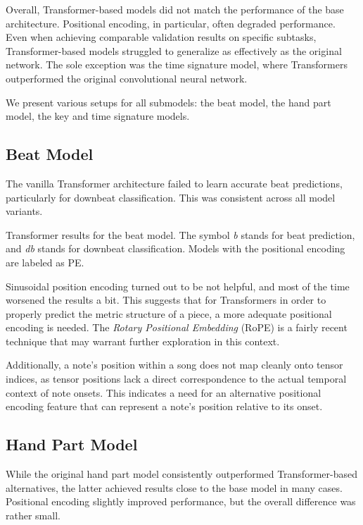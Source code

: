 Overall, Transformer-based models did not match the performance of the base architecture. Positional encoding, in particular, often degraded performance. Even when achieving comparable validation results on specific subtasks, Transformer-based models struggled to generalize as effectively as the original network. The sole exception was the time signature model, where Transformers outperformed the original convolutional neural network.

We present various setups for all submodels: the beat model, the hand part model, the key and time signature models.

\subsection{Beat Model}

The vanilla Transformer architecture failed to learn accurate beat predictions, particularly for downbeat classification. This was consistent across all model variants.

\begin{table}[ht!]
\centering

\caption[Transformer results for the beat model.]{Transformer results for the beat model. The symbol \emph{b} stands for beat prediction, and \emph{db} stands for downbeat classification. Models with the positional encoding are labeled as PE.}
\label{beat_transformer}
\end{table}

Sinusoidal position encoding turned out to be not helpful, and most of the time worsened the results a bit. This suggests that for Transformers in order to properly predict the metric structure of a piece, a more adequate positional encoding is needed. The \emph{Rotary Positional Embedding} (RoPE) \cite{Su2024} is a fairly recent technique that may warrant further exploration in this context.

Additionally, a note’s position within a song does not map cleanly onto tensor indices, as tensor positions lack a direct correspondence to the actual temporal context of note onsets. This indicates a need for an alternative positional encoding feature that can represent a note’s position relative to its onset.

\subsection{Hand Part Model}

While the original hand part model consistently outperformed Transformer-based alternatives, the latter achieved results close to the base model in many cases. Positional encoding slightly improved performance, but the overall difference was rather small.

